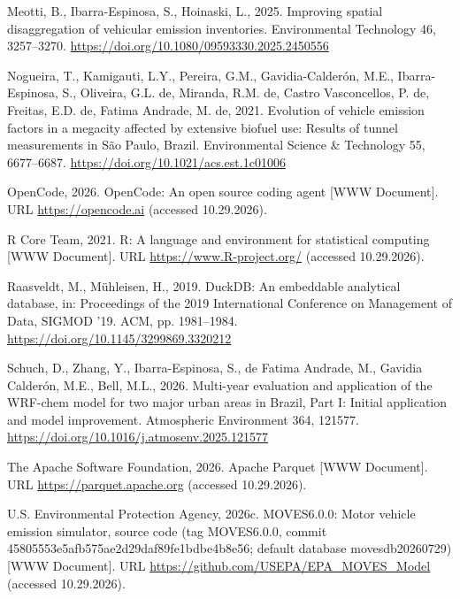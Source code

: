 \documentclass[preprint,
3p]{elsarticle} %
\newlength{\cslhangindent}
\newenvironment{CSLReferences}[2] %
 {\begin{list}{}{%
  \setlength{\itemindent}{0pt}
  \setlength{\leftmargin}{0pt}
  \setlength{\parsep}{0pt}
  \ifodd #1
   \setlength{\leftmargin}{\cslhangindent}
   \setlength{\itemindent}{-1\cslhangindent}
  \fi
  \setlength{\itemsep}{#2\baselineskip}}}
 {\end{list}}
\begin{document}
\begin{CSLReferences}{1}{0}
Meotti, B., Ibarra-Espinosa, S., Hoinaski, L., 2025. Improving spatial
disaggregation of vehicular emission inventories. Environmental
Technology 46, 3257--3270.
\url{https://doi.org/10.1080/09593330.2025.2450556}

Nogueira, T., Kamigauti, L.Y., Pereira, G.M., Gavidia-Calderón, M.E.,
Ibarra-Espinosa, S., Oliveira, G.L. de, Miranda, R.M. de, Castro
Vasconcellos, P. de, Freitas, E.D. de, Fatima Andrade, M. de, 2021.
Evolution of vehicle emission factors in a megacity affected by
extensive biofuel use: Results of tunnel measurements in {S}{ã}o
{P}aulo, {B}razil. Environmental Science \& Technology 55, 6677--6687.
\url{https://doi.org/10.1021/acs.est.1c01006}

OpenCode, 2026. {OpenCode}: An open source coding agent {[}WWW
Document{]}. URL \url{https://opencode.ai} (accessed 10.29.2026).

R Core Team, 2021. R: A language and environment for statistical
computing {[}WWW Document{]}. URL \url{https://www.R-project.org/}
(accessed 10.29.2026).

Raasveldt, M., Mühleisen, H., 2019. {DuckDB}: An embeddable analytical
database, in: Proceedings of the 2019 International Conference on
Management of Data, SIGMOD '19. ACM, pp. 1981--1984.
\url{https://doi.org/10.1145/3299869.3320212}

Schuch, D., Zhang, Y., Ibarra-Espinosa, S., de Fatima Andrade, M.,
Gavidia Calderón, M.E., Bell, M.L., 2026. Multi-year evaluation and
application of the {WRF-chem} model for two major urban areas in
{B}razil, {P}art {I}: Initial application and model improvement.
Atmospheric Environment 364, 121577.
\url{https://doi.org/10.1016/j.atmosenv.2025.121577}

The Apache Software Foundation, 2026. {Apache Parquet} {[}WWW
Document{]}. URL \url{https://parquet.apache.org} (accessed 10.29.2026).

U.S. Environmental Protection Agency, 2026c. {MOVES6.0.0}: Motor vehicle
emission simulator, source code (tag {MOVES6.0.0}, commit
45805553e5afb575ae2d29daf89fe1bdbe4b8e56; default database
movesdb20260729) {[}WWW Document{]}. URL
\url{https://github.com/USEPA/EPA_MOVES_Model} (accessed 10.29.2026).


\end{CSLReferences}
\end{document}
